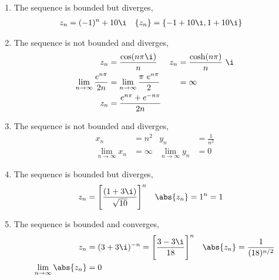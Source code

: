 \begin{enumerate}
    \item The sequence is bounded but \textcolor{y_p}{diverges},
          \begin{align}
              z_n     & = (-1)^n + 10\i           &
              \{z_n\} & = \{-1 + 10\i, 1 + 10\i\}
          \end{align}

    \item The sequence is not bounded and \textcolor{y_p}{diverges},
          \begin{align}
              z_n                 & = \frac{\cos(n\pi \i)}{n}                     &
              z_n                 & = \frac{\cosh(n\pi)}{n}\ \i                     \\
              \lim_{n \to \infty}
              \frac{e^{n\pi}}{2n} & = \lim_{n \to \infty} \frac{\pi\ e^{n\pi}}{2} &
                                  & = \infty                                        \\
              z_n                 & = \frac{e^{n\pi} + e^{-n\pi}}{2n}
          \end{align}

    \item The sequence is not bounded and \textcolor{y_p}{diverges},
          \begin{align}
              x_n                     & = n^2           &
              y_n                     & = \frac{1}{n^2}   \\
              \lim_{n \to \infty} x_n & = \infty        &
              \lim_{n \to \infty} y_n & = 0
          \end{align}

    \item The sequence is bounded but \textcolor{y_p}{diverges},
          \begin{align}
              z_n       & = \Bigg[\frac{(1 + 3\i)}{\sqrt{10}}\Bigg]^n &
              \abs{z_n} & = 1^n = 1
          \end{align}

    \item The sequence is bounded and \textcolor{y_h}{converges},
          \begin{align}
              z_n                           & = (3 + 3\i)^{-n} = \Bigg[\frac{3 - 3\i}
              {18}\Bigg]^n                  &
              \abs{z_n}                     & = \frac{1}{(18)^{n/2}}                  \\
              \lim_{n \to \infty} \abs{z_n} & = 0
          \end{align}


\end{enumerate}
